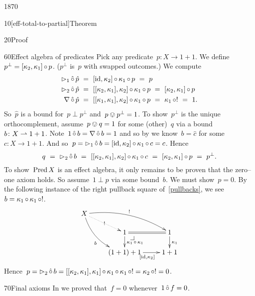 \begin{parsec}{1870}
\begin{point}{10}[eff-total-to-partial]{Theorem}
\begin{point}{20}{Proof}
\begin{point}{60}{Effect algebra of predicates}%
Pick any predicate~$p \colon X \to 1+1$.
We define~$p^\perp = [\kappa_2,\kappa_1]\mathop{\circ} p$.
($p^\perp$ is~$p$ with swapped outcomes.)
We compute
\begin{align*}
    \mathord{\vartriangleright}_1 \mathop{\hat\circ} \hat{p}
    &\ = \ [\operatorname{id},\kappa_2]\mathop{\circ}\kappa_1 \mathop{\circ} p
        \  = \ p \\
        \mathord{\vartriangleright}_2 \mathop{\hat\circ} \hat{p}
    &\ = \ [[\kappa_2, \kappa_1],\kappa_2]\mathop{\circ}\kappa_1 \mathop{\circ} p
        \  = \ [\kappa_2,\kappa_1]\mathop{\circ} p \\
    \nabla \mathop{\hat\circ} \hat{p}
    &\ = \ [[\kappa_1,\kappa_1],\kappa_2]\mathop{\circ}\kappa_1 \mathop{\circ} p
        \  = \ \kappa_1 \mathop{\circ} ! \ = \ 1.
\end{align*}
So~$\hat{p}$ is a bound for~$p \perp p^\perp$
and~$p \ovee p^\perp = 1$.
To show~$p^\perp$ is the unique orthocomplement,
    assume~$p \ovee q = 1$ for some (other)~$q$ via a bound~$b\colon
        X \rightharpoonup 1+1$.
Note~$1 \mathop{\hat\circ} b =\nabla \mathop{\hat\circ} b = 1$
    and so by 
    we know~$b = \hat{c}$ for some~$c\colon X \to 1+1$.
    And so~$p = \mathord{\vartriangleright}_1 \mathop{\hat\circ} b = [\operatorname{id}, \kappa_2]\mathop{\circ} \kappa_1 \mathop{\circ} c
                    = c$. Hence
\begin{equation*}
q \ =\  \pproj_2 \hafter b \ =\  [[\kappa_2, \kappa_1],\kappa_2] \after
    \kappa_1\after c \ =\  [\kappa_2,\kappa_1]\after p \ =\  p^\perp.
\end{equation*}
To show~$\operatorname{Pred} X$ is an effect algebra,
it only remains to be proven that the zero--one axiom holds.
So assume~$1 \perp p$ via some bound~$b$. We must show~$p=0$.
By the following instance of the right pullback square of~\eqref{pullbacks},
    we see~$b = \kappa_1 \mathop{\circ} \kappa_1 \mathop{\circ} !$.
\begin{equation*}
    \xymatrix@R-.8pc{
        X \ar@{.>}[rd]|{!}
    \ar@/^1pc/[rrd]^{!}
        \ar@/_1pc/[rdd]_b
        \\& 1 \pullback
        \ar@{=}[r]
        \ar[d]^{\kappa_1\after\kappa_1}
    & 1
        \ar[d]^{\kappa_1}
        \\& (1+1)+1
        \ar[r]_{[\id,\kappa_2]}
&1+1
}
\end{equation*}
Hence~$p = \mathord{\vartriangleright}_2 \mathop{\hat\circ} b = [[\kappa_2,\kappa_1],\kappa_1]\mathop{\circ}
                        \kappa_1 \mathop{\circ} \kappa_1 \mathop{\circ} ! = \kappa_2 \mathop{\circ} ! = 0$.
\end{point}
\begin{point}{70}{Final axioms}%
In  we proved that~$f = 0$ whenever~$1 \mathop{\hat\circ} f = 0$.

\end{point}
\end{point}
\end{point}
\end{parsec}
